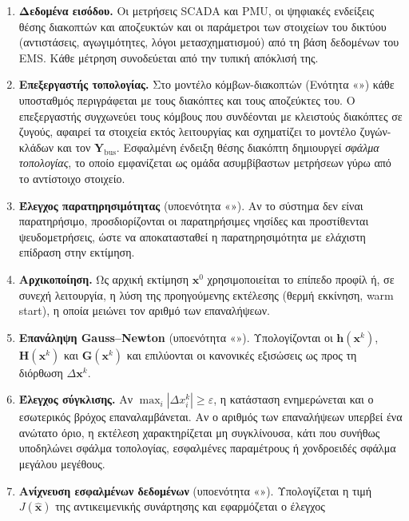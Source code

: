 \begin{enumerate}
\item \textbf{Δεδομένα εισόδου.} Οι μετρήσεις SCADA και PMU, οι ψηφιακές ενδείξεις
      θέσης διακοπτών και αποζευκτών και οι παράμετροι των στοιχείων του δικτύου (αντιστάσεις,
      αγωγιμότητες, λόγοι μετασχηματισμού) από τη βάση δεδομένων του EMS. Κάθε μέτρηση
      συνοδεύεται από την τυπική απόκλισή της.
\item \textbf{Επεξεργαστής τοπολογίας.} Στο μοντέλο κόμβων-διακοπτών (Ενότητα «»)
      κάθε υποσταθμός περιγράφεται με τους διακόπτες και τους αποζεύκτες του. Ο επεξεργαστής
      συγχωνεύει τους κόμβους που συνδέονται με κλειστούς διακόπτες σε ζυγούς, αφαιρεί τα
      στοιχεία εκτός λειτουργίας και σχηματίζει το μοντέλο ζυγών-κλάδων και τον
      $\mathbf{Y}_{\mathrm{bus}}$. Εσφαλμένη ένδειξη θέσης διακόπτη δημιουργεί \emph{σφάλμα
      τοπολογίας}, το οποίο εμφανίζεται ως ομάδα ασυμβίβαστων μετρήσεων γύρω από το
      αντίστοιχο στοιχείο.
\item \textbf{Έλεγχος παρατηρησιμότητας} (υποενότητα «»). Αν το σύστημα δεν είναι
      παρατηρήσιμο, προσδιορίζονται οι παρατηρήσιμες νησίδες και προστίθενται
      ψευδομετρήσεις, ώστε να αποκατασταθεί η παρατηρησιμότητα με ελάχιστη επίδραση στην
      εκτίμηση.
\item \textbf{Αρχικοποίηση.} Ως αρχική εκτίμηση $\mathbf{x}^{0}$ χρησιμοποιείται το επίπεδο
      προφίλ ή, σε συνεχή λειτουργία, η λύση της προηγούμενης εκτέλεσης (θερμή εκκίνηση,
      warm start), η οποία μειώνει τον αριθμό των επαναλήψεων.
\item \textbf{Επανάληψη Gauss--Newton} (υποενότητα «»). Υπολογίζονται οι
      $\mathbf{h}(\mathbf{x}^{k})$, $\mathbf{H}(\mathbf{x}^{k})$ και $\mathbf{G}(\mathbf{x}^{k})$ και
      επιλύονται οι κανονικές εξισώσεις ως προς τη διόρθωση $\Delta\mathbf{x}^{k}$.
\item \textbf{Έλεγχος σύγκλισης.} Αν $\max_i |\Delta x_i^{k}| \ge \varepsilon$, η κατάσταση
      ενημερώνεται και ο εσωτερικός βρόχος επαναλαμβάνεται. Αν ο αριθμός των επαναλήψεων
      υπερβεί ένα ανώτατο όριο, η εκτέλεση χαρακτηρίζεται μη συγκλίνουσα, κάτι που συνήθως
      υποδηλώνει σφάλμα τοπολογίας, εσφαλμένες παραμέτρους ή χονδροειδές σφάλμα μεγάλου
      μεγέθους.
\item \textbf{Ανίχνευση εσφαλμένων δεδομένων} (υποενότητα «»). Υπολογίζεται η τιμή
      $J(\hat{\mathbf{x}})$ της αντικειμενικής συνάρτησης και εφαρμόζεται ο έλεγχος

\end{enumerate}
